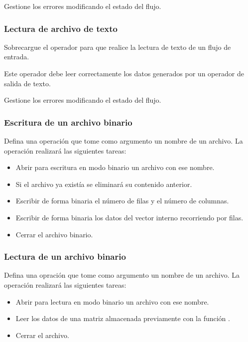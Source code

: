Gestione los errores modificando el estado del flujo.

\subsubsection{Lectura de archivo de texto}

Sobrecargue el operador \cppkey{>>} para que realice la lectura de texto de un
flujo de entrada.

Este operador debe leer correctamente los datos generados por un operador de
salida de texto.

Gestione los errores modificando el estado del flujo.

\subsubsection{Escritura de un archivo binario}

Defina una operación  que tome como argumento un nombre de un
archivo. La operación realizará las siguientes tareas:

\begin{itemize}
  \item Abrir para escritura en modo binario un archivo con ese nombre.
  \item Si el archivo ya existía se eliminará su contenido anterior.
  \item Escribir de forma binaria el número de filas y el número de columnas.
  \item Escribir de forma binaria los datos del vector interno recorriendo por
filas.
  \item Cerrar el archivo binario.
\end{itemize}

\subsubsection{Lectura de un archivo binario}

Defina una opración  que tome como argumento un nombre de un
archivo. La operación realizará las siguientes tareas:

\begin{itemize}
  \item Abrir para lectura en modo binario un archivo con ese nombre.
  \item Leer los datos de una matriz almacenada previamente con la función
.
  \item Cerrar el archivo.
\end{itemize}

